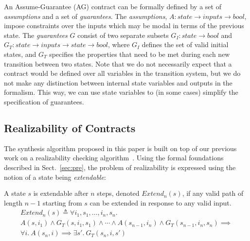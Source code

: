 An Assume-Guarantee (AG) contract can be formally defined by a set of
\emph{assumptions} and a set of \emph{guarantees}. The
\emph{assumptions}, $A: state \rightarrow inputs \rightarrow bool$,
impose constraints over the inputs which may be modal in terms of the
previous state. The \emph{guarantees} $G$ consist of two separate
subsets $G_I: state \rightarrow bool$ and $G_T: state \rightarrow
inputs \rightarrow state \rightarrow bool$, where $G_I$ defines the
set of valid initial states, and $G_T$ specifies the properties that
need to be met during each new transition between two states. Note
that we do not necessarily expect that a contract would be defined
over all variables in the transition system, but we do not make any
distinction between internal state variables and outputs in the
formalism. This way, we can use state variables to (in some cases)
simplify the specification of guarantees.

\subsection{Realizability of Contracts}
\label{sec:old}

The synthesis algorithm proposed in this paper is built on top of our previous
work on a realizability checking algorithm~\cite{Katis15:Realizability}.
Using the formal foundations described in Sect.~\ref{sec:pre}, the problem of realizability is expressed using the notion of a state being \emph{extendable}:

\begin{definition}
\label{def:extend}
A state $s$ is extendable after $n$ steps, denoted $\mathit{Extend}_{n}(s)$, if
any valid path of length $n-1$ starting from $s$ can be extended in response to
any valid input.%
%
\begin{multline*}%
\mathit{Extend}_{n}(s) \triangleq \forall i_1, s_1, \ldots, i_n, s_n.\\ A(s, i_1) \land G_T(s, i_1, s_1)
\land \cdots \land
A(s_{n-1}, i_n) \land G_T(s_{n-1}, i_n, s_n)
\implies \\
\forall i.~ A(s_n, i) \implies \exists s'.~ G_T(s_n, i, s')
\end{multline*}
\end{definition}

